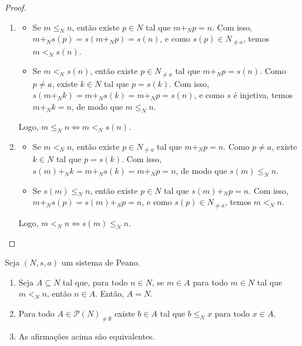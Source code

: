 \begin{proof}
    \leavevmode
        \begin{enumerate}[leftmargin=*, align=left, label=\textbf{(\alph*)}]
            \item 
                \begin{itemize}
                    \item[($\Rightarrow$)] Se $m \leq_N n$, então existe $p \in N$ tal que $m +_N p = n$. Com isso, $m +_N s(p) = s(m +_N p) = s(n)$, e como $s(p) \in N_{\neq a}$, temos $m <_N s(n)$. \blackproof
                    \item[($\Leftarrow$)] Se $m <_N s(n)$, então existe $p \in N_{\neq a}$ tal que $m +_N p = s(n)$. Como $p \neq a$, existe $k \in N$ tal que $p = s(k)$. Com isso, $s(m +_N k) = m +_N s(k) = m +_N p = s(n)$, e como $s$ é injetiva, temos $m +_N k = n$, de modo que $m \leq_N n$. \blackproof
                \end{itemize}
            Logo, $m \leq_N n \Leftrightarrow m <_N s(n)$. \blackproof
            \item 
                \begin{itemize}
                    \item[($\Rightarrow$)] Se $m <_N n$, então existe $p \in N_{\neq a}$ tal que $m +_N p = n$. Como $p \neq a$, existe $k \in N$ tal que $p = s(k)$. Com isso, $s(m) +_N k = m +_N s(k) = m +_N p = n$, de modo que $s(m) \leq_N n$. \blackproof
                    \item[($\Leftarrow$)] Se $s(m) \leq_N n$, então existe $p \in N$ tal que $s(m) +_N p = n$. Com isso, $m +_N s(p) = s(m) +_N p = n$, e como $s(p) \in N_{\neq a}$, temos $m <_N n$. \blackproof
                \end{itemize}
            Logo, $m <_N n \Leftrightarrow s(m) \leq_N n$. \blackproof
        \end{enumerate}
\end{proof}

\begin{theorem} \label{teo.set:inducao_e_boaordem}
    Seja $(N,s,a)$ um sistema de Peano.
        \begin{enumerate}[leftmargin=*, align=left, label=\textbf{(\alph*)}]
            \item Seja $A \subseteq N$ tal que, para todo $n \in N$, se $m \in A$ para todo $m \in N$ tal que $m <_N n$, então $n \in A$. Então, $A = N$.
            \item Para todo $A \in \mathcal{P}(N)_{\neq \emptyset}$ existe $b \in A$ tal que $b \leq_N x$ para todo $x \in A$.
            \item As afirmações acima são equivalentes.
        \end{enumerate}
\end{theorem}

